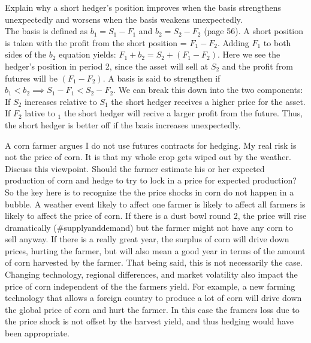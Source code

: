 \documentclass[12pt]{article}
\newenvironment{problem}[3][Problem]{\begin{trivlist}
\item[\hskip \labelsep {\bfseries #1}\hskip \labelsep {\bfseries #2.}]}{\end{trivlist}}
\begin{document}
\begin{problem}{3.10}. Explain why a short hedger’s position improves when the basis strengthens unexpectedly and
worsens when the basis weakens unexpectedly.  \\

The basis is defined as $b_1 = S_1 - F_1$ and $b_2 = S_2 - F_2$ (page 56). A short position is taken with the profit from the short position = $F_1-F_2$. Adding $F_1$ to both sides of the $b_2$ equation yields: $F_1 + b_2 = S_2 +(F_1-F_2)$. Here we see the hedger's position in period 2, since the asset will sell at $S_2$ and the profit from futures will be $(F_1-F_2)$. A basis is said to strengthen if $b_1 < b_2 \implies S_1 - F_1 < S_2 - F_2$. We can break this down into the two components: If $S_2$ increases relative to $S_1$ the short hedger receives a higher price for the asset. If $F_2$ lative to $_1$ the short hedger will recive a larger profit from the future. Thus, the short hedger is better off if the basis increases unexpectedly. 
\end{problem}

\begin{problem}{3.17}. A corn farmer argues I do not use futures contracts for hedging. My real risk is not the price of
corn. It is that my whole crop gets wiped out by the weather. Discuss this viewpoint. Should the
farmer estimate his or her expected production of corn and hedge to try to lock in a price for
expected production?\\ 

So the key here is to recognize the the price shocks in corn do not happen in a bubble. A weather event likely to affect one farmer is likely to affect all farmers is likely to affect the price of corn. If there is a dust bowl round 2, the price will rise dramatically (\#supplyanddemand) but the farmer might not have any corn to sell anyway. If there is a really great year, the surplus of corn will drive down prices, hurting the farmer, but will also mean a good year in terms of the amount of corn harvested by the farmer. That being said, this is not necessarily the case. Changing technology, regional differences, and market volatility also impact the price of corn independent of the the farmers yield. For example, a new farming technology that allows a foreign country to produce a lot of corn will drive down the global price of corn and hurt the farmer. In this case the framers loss due to the price shock is not offset by the harvest yield, and thus hedging would have been appropriate. 
\end{problem} 
  
\end{document}
